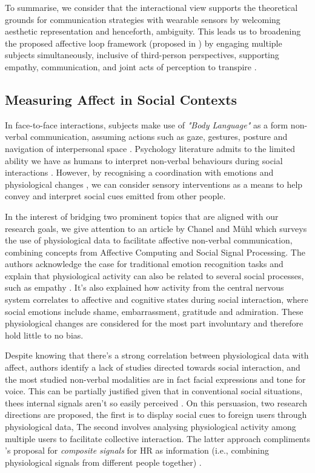 To summarise, we consider that the interactional view supports the theoretical grounds for communication strategies with wearable sensors by welcoming aesthetic representation and henceforth, ambiguity. This leads us to broadening the proposed affective loop framework (proposed in \cite{hook_affective_2009}) by engaging multiple subjects simultaneously, inclusive of third-person perspectives, supporting empathy, communication, and joint acts of perception to transpire \cite{turmo_vidal_designing_2021,francoise_designing_2017}.

\subsection{Measuring Affect in Social Contexts}
\label{lit_reivew:ssp}
In face-to-face interactions, subjects make use of \textit{"Body Language"} as a form non-verbal communication, assuming actions such as gaze, gestures, posture and navigation of interpersonal space \cite{dobre_immersive_2022}. Psychology literature admits to the limited ability we have as humans to interpret non-verbal behaviours during social interactions \cite{joseph_emotional_2010}. However, by recognising a coordination with emotions and physiological changes \cite{mayer_human_2008}, we can consider sensory interventions as a means to help convey and interpret social cues emitted from other people.

In the interest of bridging two prominent topics that are aligned with our research goals, we give attention to an article by Chanel and Mühl \cite{chanel_connecting_2015} which surveys the use of physiological data to facilitate affective non-verbal communication, combining concepts from Affective Computing and Social Signal Processing. The authors acknowledge the case for traditional emotion recognition tasks and explain that physiological activity can also be related to several social processes, such as empathy \cite{levenson_empathy_1992}. It's also explained how activity from the central nervous system correlates to affective and cognitive states during social interaction, where social emotions include shame, embarrassment, gratitude and admiration. These physiological changes are considered for the most part involuntary and therefore hold little to no bias.

Despite knowing that there's a strong correlation between physiological data with affect, authors identify a lack of studies directed towards social interaction, and the most studied non-verbal modalities are in fact facial expressions and tone for voice. This can be partially justified given that in conventional social situations, thees internal signals aren't so easily perceived \cite{vinciarelli_social_2009}. On this persuasion, two research directions are proposed, the first is to display social cues to foreign users through physiological data, The second involves analysing physiological activity among multiple users to facilitate collective interaction. The latter approach compliments \citeauthor{slovak_understanding_2012}'s proposal for \textit{composite signals} for HR as information (i.e., combining physiological signals from different people together) \cite{slovak_understanding_2012}.

